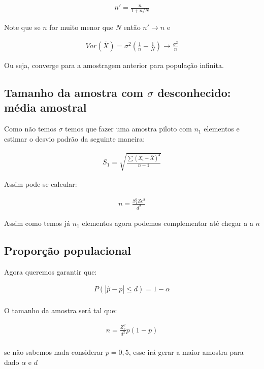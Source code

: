 \documentclass[
  letterpaper,
  DIV=11,
  numbers=noendperiod]{scrartcl}
\begin{document}
\[\begin{array}{ccc}
n' = \frac{n}{1+ n/N}
\end{array}\]

Note que se \(n\) for muito menor que \(N\) então \(n' \rightarrow n\) e

\[\begin{array}{ccc}
Var(\overline{X}) = \sigma^{2}(\frac{1}{n}-\frac{1}{N}) \rightarrow \frac{\sigma^{2}}{n} 
\end{array}\]

Ou seja, converge para a amostragem anterior para população infinita.

\subsection{\texorpdfstring{Tamanho da amostra com \(\sigma\)
desconhecido: média
amostral}{Tamanho da amostra com \textbackslash sigma desconhecido: média amostral}}\label{tamanho-da-amostra-com-sigma-desconhecido-muxe9dia-amostral}

Como não temos \(\sigma\) temos que fazer uma amostra piloto com \(n_1\)
elementos e estimar o desvio padrão da seguinte maneira:

\[\begin{array}{ccc}
S_1=\sqrt{\frac{\sum (X_i - \overline{X})^{2}}{n-1}}
\end{array}\]

Assim pode-se calcular:

\[\begin{array}{ccc}
n=\frac{S_1 ^{2} Zc^{2}}{d^{2}} 
\end{array}\]

Assim como temos já \(n_1\) elementos agora podemos complementar até
chegar a a \(n\)

\subsection{Proporção populacional}\label{proporuxe7uxe3o-populacional}

Agora queremos garantir que:

\[\begin{array}{ccc}
P(|\hat{p} - p|\leq d) = 1 - \alpha
\end{array}\]\\

O tamanho da amostra será tal que:

\[\begin{array}{ccc}
n=\frac{ Z_{c}^{2}}{d^{2}} p (1-p)
\end{array}\]\\
se não sabemos nada considerar \(p=0,5\), esse irá gerar a maior amostra
para dado \(\alpha\) e \(d\)\\
\end{document}
